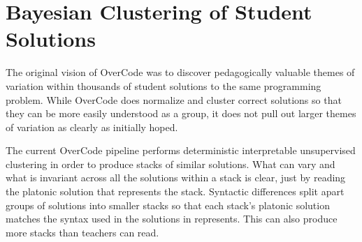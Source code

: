\chapter{Bayesian Clustering of Student Solutions}\label{chapter:grovercode}

The original vision of OverCode was to discover pedagogically valuable themes of variation within thousands of student solutions to the same programming problem. While OverCode does normalize and cluster correct solutions so that they can be more easily understood as a group, it does not pull out larger themes of variation as clearly as initially hoped.



The current OverCode pipeline performs deterministic interpretable unsupervised clustering in order to produce stacks of similar solutions. What can vary and what is invariant across all the solutions within a stack is clear, just by reading the platonic solution that represents the stack. Syntactic differences split apart groups of solutions into smaller stacks so that each stack's platonic solution matches the syntax used in the solutions in represents. This can also produce more stacks than teachers can read.%





